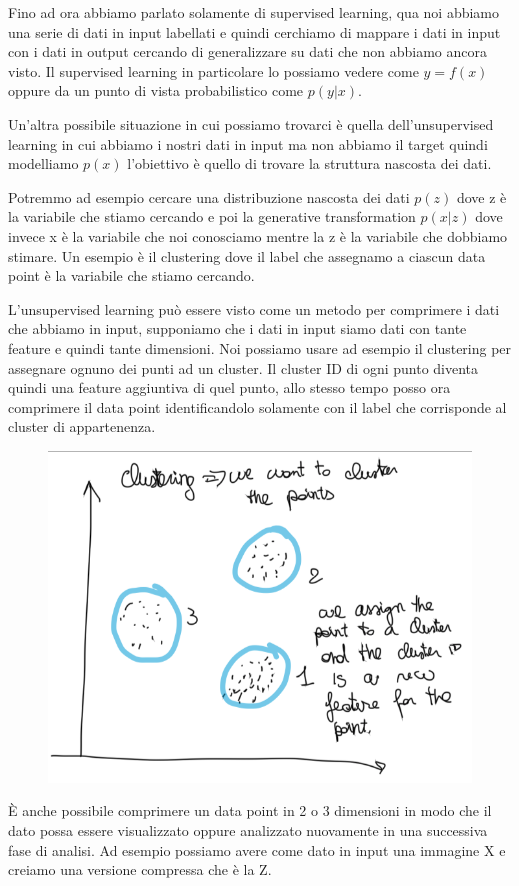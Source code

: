 \documentclass[14pt]{extreport}
\begin{document}
Fino ad ora abbiamo parlato solamente di supervised learning, qua noi abbiamo una serie di dati in input labellati e quindi cerchiamo di mappare i
dati in input con i dati in output cercando di generalizzare su dati che non abbiamo ancora visto. Il supervised learning in particolare lo possiamo
vedere come $y=f(x)$ oppure da un punto di vista probabilistico come $p(y|x)$.

Un'altra possibile situazione in cui possiamo trovarci è quella dell'unsupervised learning in cui abbiamo i nostri dati in input ma non abbiamo il
target quindi modelliamo $p(x)$ l'obiettivo è quello di trovare la struttura nascosta dei dati.

Potremmo ad esempio cercare una distribuzione nascosta dei dati $p(z)$ dove z è la variabile che stiamo cercando e poi la generative transformation
$p(x|z)$ dove invece x è la variabile che noi conosciamo mentre la z è la variabile che dobbiamo stimare. Un esempio è il clustering dove il label che
assegnamo a ciascun data point è la variabile che stiamo cercando.

L'unsupervised learning può essere visto come un metodo per comprimere i dati che abbiamo in input, supponiamo che i dati in input siamo dati con
tante feature e quindi tante dimensioni. Noi possiamo usare ad esempio il clustering per assegnare ognuno dei punti ad un cluster. Il cluster ID di
ogni punto diventa quindi una feature aggiuntiva di quel punto, allo stesso tempo posso ora comprimere il data point identificandolo solamente con il
label che corrisponde al cluster di appartenenza.

\begin{figure}[H]
	\centering
	\includegraphics[width=0.4\linewidth]{434.jpeg}
\end{figure}

È anche possibile comprimere un data point in 2 o 3 dimensioni in modo che il dato possa essere visualizzato oppure analizzato nuovamente in una
successiva fase di analisi. Ad esempio possiamo avere come dato in input una immagine X e creiamo una versione compressa che è la Z.
\end{document}
